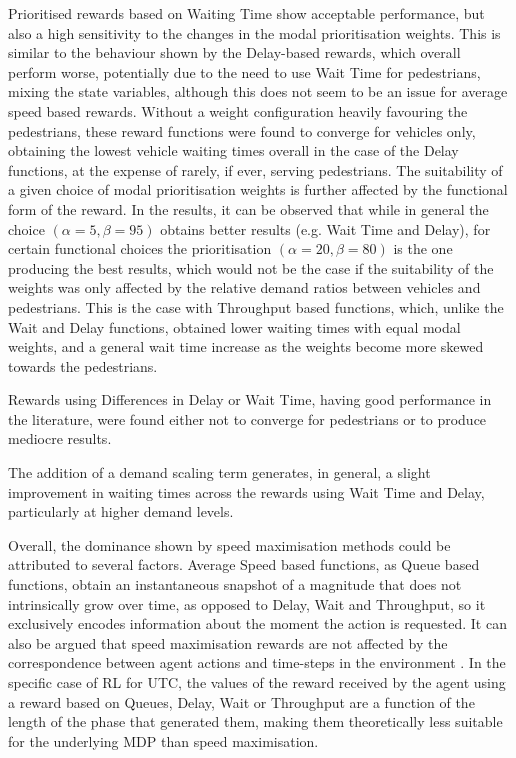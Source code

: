\documentclass[conference]{IEEEtran}
\begin{document}
Prioritised rewards based on Waiting Time show acceptable performance, but also a high sensitivity to the changes in the modal prioritisation weights. 
This is similar to the behaviour shown by the Delay-based rewards, which overall perform worse, potentially due to the need to use Wait Time for pedestrians, mixing the state variables, although this does not seem to be an issue for average speed based rewards.
Without a weight configuration heavily favouring the pedestrians, these reward functions were found to converge for vehicles only, obtaining the lowest vehicle waiting times overall in the case of the Delay functions, at the expense of rarely, if ever, serving pedestrians.
The suitability of a given choice of modal prioritisation weights is further affected by the functional form of the reward.
In the results, it can be observed that while in general the choice $(\alpha=5,\beta=95)$ obtains better results (e.g. Wait Time and Delay), for certain functional choices the prioritisation $(\alpha=20,\beta=80)$ is the one producing the best results, which would not be the case if the suitability of the weights was only affected by the relative demand ratios between vehicles and pedestrians. 
This is the case with Throughput based functions, which, unlike the Wait and Delay functions, obtained lower waiting times with equal modal weights, and a general wait time increase as the weights become more skewed towards the pedestrians.

Rewards using Differences in Delay or Wait Time, having good performance in the literature, were found either not to converge for pedestrians or to produce mediocre results.

The addition of a demand scaling term generates, in general, a slight improvement in waiting times across the rewards using Wait Time and Delay, particularly at higher demand levels. 

Overall, the dominance shown by speed maximisation methods could be attributed to several factors.
Average Speed based functions, as Queue based functions, obtain an instantaneous snapshot of a magnitude that does not intrinsically grow over time, as opposed to Delay, Wait and Throughput, so it exclusively encodes information about the moment the action is requested.
It can also be argued that speed maximisation rewards are not affected by the correspondence between agent actions and time-steps in the environment . In the specific case of RL for UTC, the values of the reward received by the agent using a reward based on Queues, Delay, Wait or Throughput are a function of the length of the phase that generated them, making them theoretically less suitable for the underlying MDP than speed maximisation.
\end{document}
